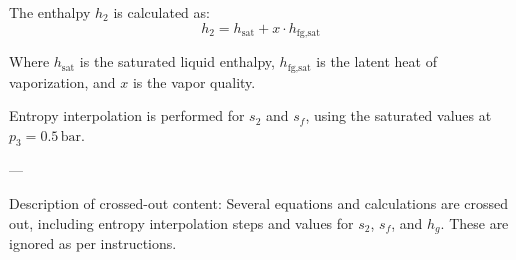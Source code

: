 The enthalpy \( h_2 \) is calculated as:  
\[
h_2 = h_{\text{sat}} + x \cdot h_{\text{fg,sat}}
\]  

Where \( h_{\text{sat}} \) is the saturated liquid enthalpy, \( h_{\text{fg,sat}} \) is the latent heat of vaporization, and \( x \) is the vapor quality.  

Entropy interpolation is performed for \( s_2 \) and \( s_f \), using the saturated values at \( p_3 = 0.5 \, \text{bar} \).  

---

Description of crossed-out content:  
Several equations and calculations are crossed out, including entropy interpolation steps and values for \( s_2 \), \( s_f \), and \( h_g \). These are ignored as per instructions.